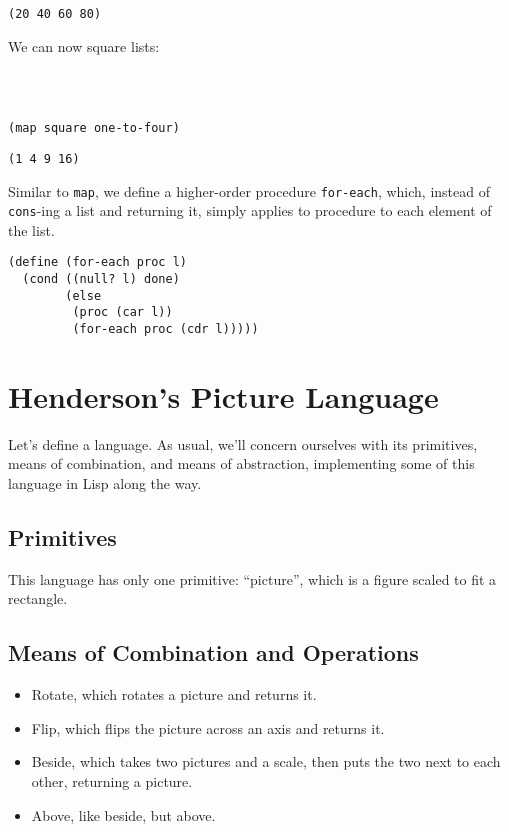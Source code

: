 \documentclass[9pt]{report}
\begin{document}
\begin{verbatim}
(20 40 60 80)
\end{verbatim}


We can now square lists:
\begin{verbatim}



(map square one-to-four)
\end{verbatim}

\begin{verbatim}
(1 4 9 16)
\end{verbatim}


Similar to \texttt{map}, we define a higher-order procedure \texttt{for-each},
which, instead of \texttt{cons}-ing a list and returning it, simply
applies to procedure to each element of the list.

\begin{verbatim}
(define (for-each proc l)
  (cond ((null? l) done)
        (else
         (proc (car l))
         (for-each proc (cdr l)))))
\end{verbatim}

\section{Henderson's Picture Language}
\label{sec:org5268acc}

Let's define a language. As usual, we'll concern ourselves with its
primitives, means of combination, and means of abstraction,
implementing some of this language in Lisp along the way.


\subsection{Primitives}
\label{sec:org66e54a2}
This language has only one primitive: ``picture'', which is a figure
scaled to fit a rectangle.


\subsection{Means of Combination and Operations}
\label{sec:orgb817fb9}

\begin{itemize}
\item Rotate, which rotates a picture and returns it.
\item Flip, which flips the picture across an axis and returns it.
\item Beside, which takes two pictures and a scale, then puts the two
next to each other, returning a picture.
\item Above, like beside, but above.
\end{itemize}
\end{document}
